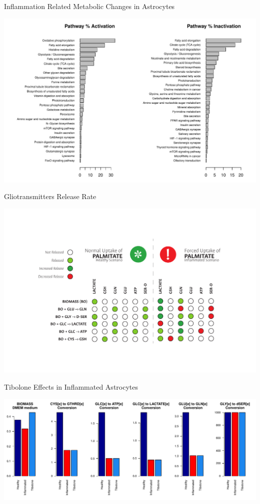 \documentclass[11pt]{beamer}
\begin{document}
\begin{frame}{Inflammation Related Metabolic Changes in Astrocytes}
\begin{center}
\includegraphics[width=\textwidth]{Healthy2Inflammated}
\end{center}
\end{frame}
\begin{frame}{Gliotransmitters Release Rate}
\begin{center}
\includegraphics[width=\textwidth]{GTi}
\end{center}
\end{frame}
\begin{frame}{Tibolone Effects in Inflammated Astrocytes}
\begin{center}
\includegraphics[width=\textwidth]{Effects}
\end{center}
\end{frame}
\end{document}
